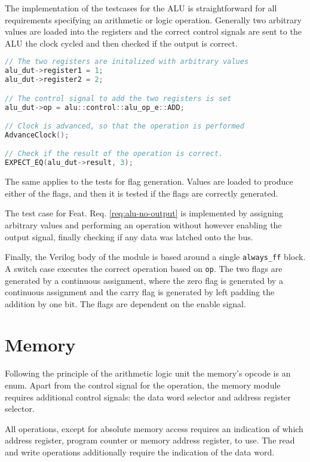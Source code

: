 The implementation of the testcases for the ALU is straightforward for all requirements specifying an arithmetic or logic operation. Generally two arbitrary values are loaded into the registers and the correct control signals are sent to the ALU the clock cycled and then checked if the output is correct. 


\begin{lstlisting}[language=c++]
// The two registers are initalized with arbitrary values
alu_dut->register1 = 1; 
alu_dut->register2 = 2; 

// The control signal to add the two registers is set
alu_dut->op = alu::control::alu_op_e::ADD;  

// Clock is advanced, so that the operation is performed
AdvanceClock();  

// Check if the result of the operation is correct.
EXPECT_EQ(alu_dut->result, 3); 
\end{lstlisting}

The same applies to the tests for flag generation. Values are loaded to produce either of the flags, and then it is tested if the flags are correctly generated.

The test case for Feat. Req. \ref{req:alu-no-output} is implemented by assigning arbitrary values and performing an operation without however enabling the output signal, finally checking if any data was latched onto the bus.  

Finally, the Verilog body of the module is based around a single \texttt{always\_ff} block. A switch case executes the correct operation based on \texttt{op}. The two flags are generated by a continuous assignment, where the zero flag is generated by a continuous assignment and the carry flag is generated by left padding the addition by one bit. The flags are dependent on the enable signal. 

\section{Memory}

Following the principle of the arithmetic logic unit the memory's opcode is an enum. Apart from the control signal for the operation, the memory module requires additional control signals: the data word selector and address register selector.

All operations, except for absolute memory access requires an indication of which address register, program counter or memory address register, to use. The read and write operations additionally require the indication of the data word. 

